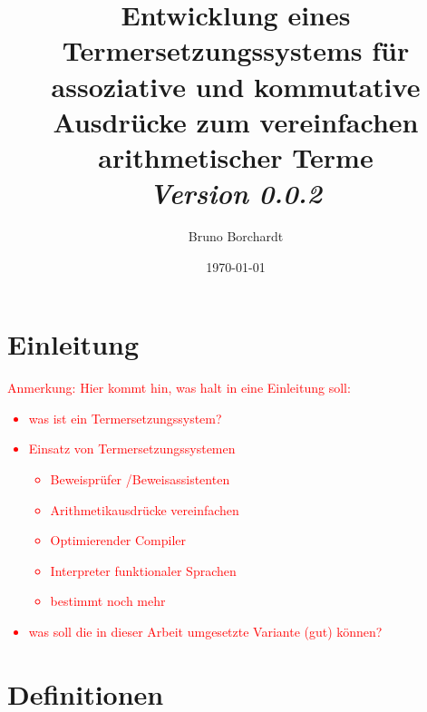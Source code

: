 \documentclass{scrartcl}
\title{Entwicklung eines Termersetzungssystems für assoziative und kommutative Ausdrücke zum vereinfachen arithmetischer Terme\\ \textit{Version 0.0.2}}
\author{Bruno Borchardt}
\date{\today}
\begin{document}
\maketitle

\tableofcontents

\clearpage

\section{Einleitung}
\textcolor{red} {
\begin{itshape}
Anmerkung: Hier kommt hin, was halt in eine Einleitung soll:
\begin{itemize}
    \item was ist ein Termersetzungssystem?
    \item Einsatz von Termersetzungssystemen
    \begin{itemize}
        \item Beweisprüfer /Beweisassistenten
        \item Arithmetikausdrücke vereinfachen
        \item Optimierender Compiler
	\item Interpreter funktionaler Sprachen
        \item bestimmt noch mehr
    \end{itemize}
    \item was soll die in dieser Arbeit umgesetzte Variante (gut) können?
\end{itemize}
\end{itshape}
}

\section{Definitionen}
\end{document}
